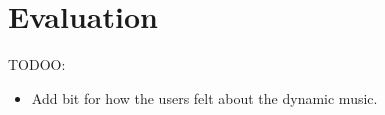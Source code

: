 \documentclass{l4proj}
\begin{document}




\chapter{Evaluation} 

TODOO:
\begin{itemize}
    \item Add bit for how the users felt about the dynamic music.
    
\end{itemize}


\end{document}
